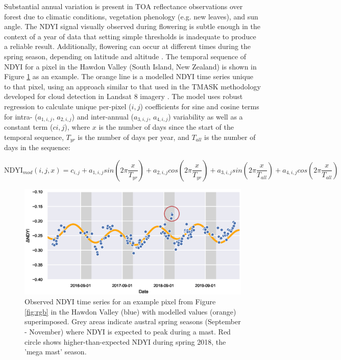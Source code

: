\documentclass[remotesensing,article,submit,moreauthors,pdftex]{Definitions/mdpi}
\begin{document}
Substantial annual variation is present in TOA reflectance observations over forest due to climatic conditions, vegetation phenology (e.g. new leaves), and sun angle. The NDYI signal visually observed during flowering is subtle enough in the context of a year of data that setting simple thresholds is inadequate to produce a reliable result. Additionally, flowering can occur at different times during the spring season, depending on latitude and altitude \citep{Wardle1984,Allen2014}. The temporal sequence of NDYI for a pixel in the Hawdon Valley (South Island, New Zealand) is shown in Figure \ref{fig:sine} as an example. The orange line is a modelled NDYI time series unique to that pixel, using an approach similar to that used in the TMASK methodology developed for cloud detection in Landsat 8 imagery \citep{Zhu2014}. The model uses robust regression to calculate unique per-pixel ($i,j$) coefficients for sine and cosine terms for intra- ($a_{1,i,j}$, $a_{2,i,j}$) and inter-annual ($a_{3,i,j}$, $a_{4,i,j}$) variability as well as a constant term ($c{i,j}$), where $x$ is the number of days since the start of the temporal sequence, $T_{yr}$ is the number of days per year, and $T_{all}$ is the number of days in the sequence:

\begin{equation}
    \text{NDYI}_{mod}(i,j,x) = c_{i,j} + a_{1,i,j}sin(2\pi\frac{x}{T_{yr}}) + a_{2,i,j}cos(2\pi\frac{x}{T_{yr}}) + a_{3,i,j}sin(2\pi\frac{x}{T_{all}}) + a_{4,i,j}cos(2\pi\frac{x}{T_{all}})
\end{equation}

\begin{figure}[H]
    \centering
    \includegraphics[width=\textwidth]{images/figure2_scatter_examplepixel_2018-2019.eps}%
    \caption{Observed NDYI time series for an example pixel from Figure \ref{fig:rgb} in the Hawdon Valley (blue) with modelled values (orange) superimposed. Grey areas indicate austral spring seasons (September - November) where NDYI is expected to peak during a mast. Red circle shows higher-than-expected NDYI during spring 2018, the 'mega mast' season.}
    \label{fig:sine}
\end{figure}
\end{document}
